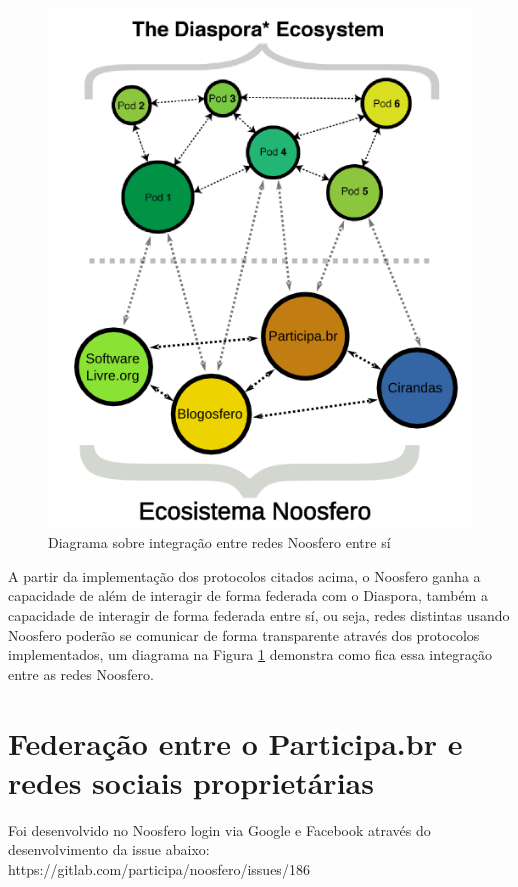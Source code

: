 \documentclass[12pt]{article}
\begin{document}
\begin{figure}[h!]
\center
\includegraphics[scale=0.4]{ecosistema-noosfero-diaspora-v2.png}
\caption{Diagrama sobre integração entre redes Noosfero entre sí}
\label{ecosistema-v2}
\end{figure}

A partir da implementação dos protocolos citados acima, o Noosfero ganha a
capacidade de além de interagir de forma federada com o Diaspora, também a
capacidade de interagir de forma federada entre sí, ou seja, redes distintas
usando Noosfero poderão se comunicar de forma transparente através dos
protocolos implementados, um diagrama na Figura \ref{ecosistema-v2} demonstra
como fica essa integração entre as redes Noosfero.

\section{Federação entre o Participa.br e redes sociais proprietárias}

Foi desenvolvido no Noosfero login via Google e Facebook através do
desenvolvimento da issue abaixo:
https://gitlab.com/participa/noosfero/issues/186
\end{document}
